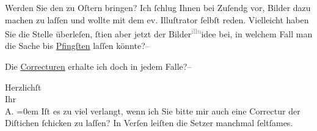\pstart
           Werden Sie den \label{K_L02998-2v}\label{K_L02998-2} zu Oſtern bringen? Ich ſchlug Ihnen bei Zuſendg
               vor, Bilder dazu machen zu laſſen und wollte mit dem ev. Illuſtrator ſelbſt reden. Vielleicht haben
               Sie die Stelle überleſen, ſti{\geminationm}en aber jetzt {\pb}der Bilder\substVorne{}\textsuperscript{\textcolor{gray}{illu}}\substDazwischen{}idee\substHinten{} bei, in welchem Fall man die Sache bis \uline{Pfingſten} laſſen könnte?–\pend
           
\pstart
           Die \uline{Correcturen} erhalte ich doch in jedem Falle?–\pend
           
\pstart
           Herzlichſt {\\[\baselineskip]}Ihr {\\[\baselineskip]}\spacefill\mbox{A.}\pend
           \leftskip=0em{}
\pstart
           Iſt es zu viel verlangt, wenn ich Sie bitte mir auch eine Correctur der Diſtichen ſchicken zu laſſen?
               In Verſen leiſten die Setzer {\pb}manchmal
               ſeltſames.\pend
           \endnumbering{}  
      